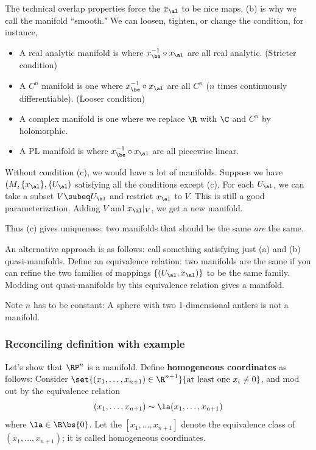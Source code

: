 The technical overlap properties force the $x_{\al}$ to be nice maps. (b) is why we call the manifold ``smooth." We can loosen, tighten, or change the condition, for instance,
\begin{itemize}
\item A real analytic manifold is where $x_{\be}^{-1}\circ x_{\al}$ are all real analytic. (Stricter condition)
\item A $C^n$ manifold is one where $x_{\be}^{-1}\circ x_{\al}$ are all $C^n$ ($n$ times continuously differentiable). (Looser condition)
\item A complex manifold is one where we replace $\R$ with $\C$ and $C^n$ by holomorphic.
\item A PL manifold is where $x_{\be}^{-1}\circ x_{\al}$ are all piecewise linear.
\end{itemize}

Without condition (c), we would have a lot of manifolds. Suppose we have $(M,\{x_{\al}\},\{U_{\al})$ satisfying all the conditions except (c). For each $U_{\al}$, we can take a subset $V\subeq U_{\al}$ and restrict $x_{\al}$ to $V$. This is still a good parameterization. Adding $V$ and $x_{\al}|_V$, we get a new manifold. 

Thus (c) gives uniqueness: two manifolds that should be the same {\it are} the same.

An alternative approach is as follows: call something satisfying just (a) and (b) quasi-manifolds. Define an equivalence relation: two manifolds are the same if you can refine the two families of mappings $\{(U_{\al},x_{\al})\}$ to be the same family. Modding out quasi-manifolds by this equivalence relation gives a manifold.

Note $n$ has to be constant: A sphere with two 1-dimensional antlers is not a manifold.

\subsubsection{Reconciling definition with example}

Let's show that $\RP^n$ is a manifold. Define \textbf{homogeneous coordinates} as follows: 
Consider $\set{(x_1,\ldots, x_{n+1})\in \R^{n+1}}{\text{at least one }x_i\ne 0}$, and mod out by the equivalence relation
\[
(x_1,\ldots, x_{n+1})\sim \la (x_1,\ldots, x_{n+1})
\]
where $\la\in \R\bs \{0\}$. Let the $[x_1,\ldots, x_{n+1}]$ denote the equivalence class of $(x_1,\ldots, x_{n+1})$; it is called homogeneous coordinates.\\

